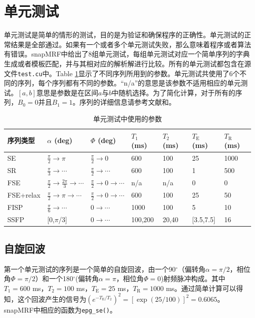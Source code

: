\section{单元测试}
单元测试是简单的情形的测试，目的是为验证和确保程序的正确性。单元测试的正常结果是全部通过。如果有一个或者多个单元测试失败，那么意味着程序或者算法有错误。snapMRF中给出了8组单元测试，每组单元测试对应一个简单序列的字典生成或者模板匹配，并与其相对应的解析解进行比较。所有的单元测试都包含在源文件\texttt{test.cu}中。Table \ref{tab:unittest}显示了不同序列所用到的参数。单元测试共使用了6个不同的序列，每个序列都有不同的参数。``n/a''的意思是该参数不适用相应的单元测试。$[a,b]$意思是参数是在区间$a$与$b$中随机选择。为了简化计算，对于所有的序列，$B_0=0$并且$B_1=1$。序列的详细信息请参考文献\cite{weigel}和\cite{web}。

\begin{table}
\centering
\caption{单元测试中使用的参数}
\begin{center}
\begin{tabular}{|l|l|l|l|l|l|l|}
\hline
\hline
序列类型 & $\alpha$ (deg) & $\Phi$ (deg) & $T_1$ (ms) & $T_2$ (ms) & $T_\mathrm{E}$ (ms) & $T_\mathrm{R}$ (ms)\\
\hline
SE & $\frac{\pi}{2}\rightarrow\pi$ & $\frac{\pi}{2}\rightarrow0$ & 600 & 100 & 25 & 1000\\
\hline
SR & $\frac{\pi}{3}\rightarrow\cdots$ & $\frac{\pi}{2}\rightarrow \cdots$ & 600 & 100 & 1 & 500\\
\hline
FSE & $\frac{\pi}{2}\rightarrow\frac{2\pi}{3}\rightarrow\cdots$ & $\frac{\pi}{2}\rightarrow0\rightarrow\cdots$ & n/a & n/a & 0 & 0\\
\hline
FSE+relax & $\frac{\pi}{2}\rightarrow\pi\rightarrow\cdots$ & $\frac{\pi}{2}\rightarrow0\rightarrow\cdots$ & 600 & 100 & 25 & 50\\
\hline
FISP & $\frac{\pi}{6}\rightarrow\cdots$ & $0\rightarrow\cdots$ & 1000 & 100 & 5 & 10\\
\hline
SSFP & [0,$\pi$/3] & $0\rightarrow\cdots$  & 100,200 & 20,40 & [3.5,7.5] & 16\\
\hline
\end{tabular}
\end{center}
\label{tab:unittest}
\end{table}

\subsection{自旋回波}
第一个单元测试的序列是一个简单的自旋回波，由一个90$^{\circ}$（偏转角$\alpha = \pi/2$，相位角$\Phi = \pi/2$）和一个180$^{\circ}$(偏转角$\alpha = \pi$，相位角$\Phi = 0$)射频脉冲构成。其中$T_1 = 600$ ms，$T_2 = 100$ ms，$T_\mathrm{E} = 25$ ms，$T_\mathrm{R} = 1000$ ms。通过简单计算可以得知，这个回波产生的信号为$(e^{-T_\mathrm{E}/T_2})^2 =[\exp(25/100)]^2=0.6065$。snapMRF中相应的函数为\texttt{epg\_se()}。

